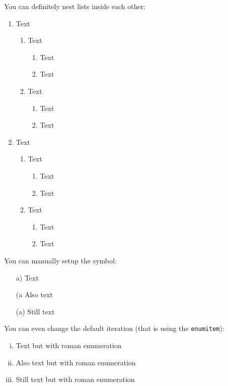 \documentclass[a4paper, 12pt]{article}
\begin{document}
\noindent You can definitely nest lists inside each other:
\begin{enumerate}
    \item Text
    \begin{enumerate}
        \item Text
        \begin{enumerate}
            \item Text
            \item Text
        \end{enumerate}
        \item Text
        \begin{enumerate}
            \item Text
            \item Text
        \end{enumerate}
    \end{enumerate}
    \item Text
    \begin{enumerate}
        \item Text
        \begin{enumerate}
            \item Text
            \item Text
        \end{enumerate}
        \item Text
        \begin{enumerate}
            \item Text
            \item Text
        \end{enumerate}
    \end{enumerate}
\end{enumerate}

\noindent You can manually setup the symbol:
\begin{enumerate}
    \item[a)] Text
    \item[(a] Also text
    \item[(a)] Still text
\end{enumerate}

\noindent You can even change the default iteration (that is using the \verb|enumitem|):
\begin{enumerate}[i.]
    \item Text but with roman enumeration
    \item Also text but with roman enumeration
    \item Still text but with roman enumeration
\end{enumerate}
\end{document}
